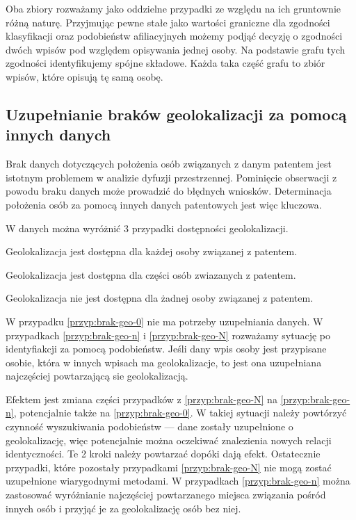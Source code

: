 Oba zbiory rozważamy jako oddzielne przypadki ze względu na ich
gruntownie różną naturę. Przyjmując pewne stałe jako wartości
graniczne dla zgodności klasyfikacji oraz podobieństw afiliacyjnych
możemy podjąć decyzję o zgodności dwóch wpisów pod względem
opisywania jednej osoby. Na podstawie grafu tych zgodności
identyfikujemy spójne składowe. Każda taka część grafu to
zbiór wpisów, które opisują tę samą osobę.



\subsection{Uzupełnianie braków geolokalizacji za pomocą innych danych}

Brak danych dotyczących położenia osób związanych z danym patentem jest
istotnym problemem w analizie dyfuzji przestrzennej. Pominięcie obserwacji
z powodu braku danych może prowadzić do błędnych wniosków. 
Determinacja położenia osób za pomocą innych danych patentowych jest
więc kluczowa.

W danych można wyróżnić 3 przypadki dostępności geolokalizacji.

\begin{przyp}\label{przyp:brak-geo-0}
Geolokalizacja jest dostępna dla każdej osoby związanej z patentem.
\end{przyp}

\begin{przyp}\label{przyp:brak-geo-n}
Geolokalizacja jest dostępna dla części osób zwiazanych z patentem.
\end{przyp}

\begin{przyp}\label{przyp:brak-geo-N}
Geolokalizacja nie jest dostępna dla żadnej osoby związanej z patentem.
\end{przyp}

W przypadku \ref{przyp:brak-geo-0} nie ma potrzeby uzupełniania danych.
W przypadkach \ref{przyp:brak-geo-n} i \ref{przyp:brak-geo-N} 
rozważamy sytuację po identyfiakcji za pomocą podobieństw. 
Jeśli dany wpis osoby jest przypisane osobie, 
która w innych wpisach ma geolokalizacje, to jest ona uzupełniana
najczęściej powtarzającą sie geolokalizacją.

Efektem jest zmiana części przypadków z \ref{przyp:brak-geo-N} na
\ref{przyp:brak-geo-n}, potencjalnie także na \ref{przyp:brak-geo-0}.
W takiej sytuacji należy powtórzyć czynność wyszukiwania podobieństw ---
dane zostały uzupełnione o geolokalizację, więc potencjalnie można
oczekiwać znalezienia nowych relacji identyczności.
Te 2 kroki należy powtarzać dopóki dają efekt. Ostatecznie
przypadki, które pozostały przypadkami \ref{przyp:brak-geo-N}
nie mogą zostać uzupełnione wiarygodnymi metodami.
W przypadkach \ref{przyp:brak-geo-n} można zastosować wyróżnianie
najczęściej powtarzanego miejsca związania pośród innych osób i przyjąć
je za geolokalizację osób bez niej.